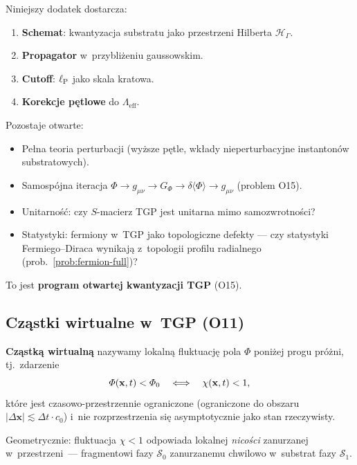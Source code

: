 \begin{problem}%
\label{prob:kwantyzacja}
Niniejszy dodatek dostarcza:
\begin{enumerate}[nosep]
    \item \textbf{Schemat}: kwantyzacja substratu jako przestrzeni
          Hilberta $\mathcal{H}_\Gamma$.
    \item \textbf{Propagator} w~przybliżeniu gaussowskim.
    \item \textbf{Cutoff}: $\ell_{\mathrm{P}}$ jako skala kratowa.
    \item \textbf{Korekcje pętlowe} do $\Lambda_{\mathrm{eff}}$.
\end{enumerate}
Pozostaje otwarte:
\begin{itemize}[nosep]
    \item Pełna teoria perturbacji (wyższe pętle,
          wkłady nieperturbacyjne instantonów substratowych).
    \item Samospójna iteracja $\Phi \to g_{\mu\nu} \to G_\Phi
          \to \delta\langle\Phi\rangle \to g_{\mu\nu}$
          (problem O15).
    \item Unitarność: czy $S$-macierz TGP jest unitarna
          mimo samozwrotności?
    \item Statystyki: fermiony w~TGP jako topologiczne defekty
          --- czy statystyki Fermiego--Diraca wynikają
          z~topologii profilu radialnego (prob.~\ref{prob:fermion-full})?
\end{itemize}
To jest \textbf{program otwartej kwantyzacji TGP} (O15).
\end{problem}

\subsection{Cz\k{a}stki wirtualne w~TGP (O11)}%
\label{app:E-virtual}

\begin{definition}\label{def:virtual-particle}
\textbf{Cz\k{a}stk\k{a} wirtualn\k{a}} nazywamy lokaln\k{a} fluktuacj\k{e}
pola $\Phi$ poni\.zej progu pr\'o\.zni, tj.\ zdarzenie
\begin{equation}\label{eq:virtual-condition}
    \varPhi(\mathbf{x}, t) < \varPhi_0
    \quad \Longleftrightarrow \quad
    \chi(\mathbf{x}, t) < 1,
\end{equation}
kt\'ore jest czasowo-przestrzennie ograniczone
(ograniczone do obszaru $|\Delta\mathbf{x}| \lesssim \Delta t \cdot c_0$)
i~nie rozprzestrzenia si\k{e} asymptotycznie jako stan rzeczywisty.

Geometrycznie: fluktuacja $\chi < 1$ odpowiada lokalnej
\emph{nicości} zanurzanej w~przestrzeni~---
fragmentowi fazy $\mathcal{S}_0$
zanurzanemu chwilowo w~substrat fazy $\mathcal{S}_1$.
\end{definition}


